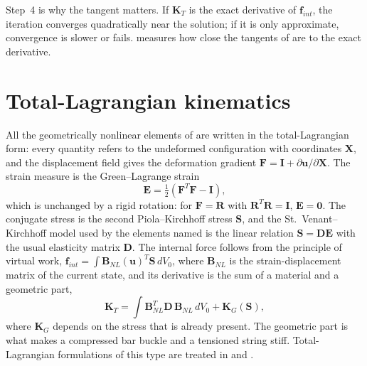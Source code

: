 
Step~4 is why the tangent matters. If $\bm K_T$ is the exact derivative of $\bm f_{int}$, the iteration converges quadratically near the solution; if it is only approximate, convergence is slower or fails.  measures how close the tangents of \fea{} are to the exact derivative.

\section{Total-Lagrangian kinematics}\label{sec:nl-tl}

All the geometrically nonlinear elements of \fea{} are written in the total-Lagrangian form: every quantity refers to the undeformed configuration with coordinates $\bm X$, and the displacement field gives the deformation gradient $\bm F=\bm I+\partial\bm u/\partial\bm X$. The strain measure is the Green--Lagrange strain
\begin{equation}\label{eq:nl-gl}
\bm E=\tfrac12\left(\bm F^{T}\bm F-\bm I\right),
\end{equation}
which is unchanged by a rigid rotation: for $\bm F=\bm R$ with $\bm R^T\bm R=\bm I$, $\bm E=\bm 0$. The conjugate stress is the second Piola--Kirchhoff stress $\bm S$, and the St.~Venant--Kirchhoff model used by the elements named  is the linear relation $\bm S=\bm D\bm E$ with the usual elasticity matrix $\bm D$. The internal force follows from the principle of virtual work, $\bm f_{int}=\int \bm B_{NL}(\bm u)^{T}\bm S\,dV_0$, where $\bm B_{NL}$ is the strain-displacement matrix of the current state, and its derivative is the sum of a material and a geometric part,
\begin{equation}\label{eq:nl-tangent}
\bm K_T=\int \bm B_{NL}^{T}\bm D\,\bm B_{NL}\,dV_0+\bm K_G(\bm S),
\end{equation}
where $\bm K_G$ depends on the stress that is already present. The geometric part is what makes a compressed bar buckle and a tensioned string stiff. Total-Lagrangian formulations of this type are treated in \citet{crisfield1981} and \citet{bathe2014fep}.

